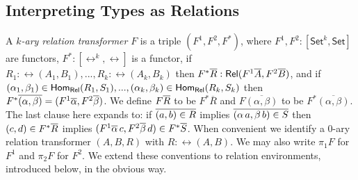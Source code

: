 \documentclass[runningheads]{llncs}
\newcommand{\set}{\mathsf{Set}}
\begin{document}
\begin{definition}
\begin{itemize}
\end{itemize}
\end{definition}

\subsection{Interpreting Types as Relations}\label{sec:rel-interp}

A {\em $k$-ary relation transformer} $F$ is a triple $(F^1, F^2,F^*)$,
where $F^1,F^2 : [\set^k,\set]$ are functors, $F^* : [\rel^k, \rel]$
is a functor, if $R_1:\rel(A_1,B_1),...,R_k:\rel(A_k,B_k)$ then $F^*
\overline{R} : \mathsf{Rel}(F^1 \overline{A}, F^2 \overline{B})$, and if $(\alpha_1, \beta_1)
\in \mathsf{Hom_{Rel}}(R_1,S_1),..., (\alpha_k, \beta_k) \in \mathsf{Hom_{Rel}}(R_k,S_k)$
then $F^* \overline{(\alpha, \beta)} = (F^1 \overline{\alpha}, F^2 \overline{\beta})$.
We define $F\overline{R}$ to be $F^*\overline{R}$ and
$F\overline{(\alpha,\beta)}$ to be $F^*\overline{(\alpha,\beta)}$.
The last clause here
expands to: if
$\overline{(a,b) \in R}$ implies $\overline{(\alpha\,a,\beta\,b) \in S}$ then
$(c,d) \in F^*\overline{R}$ implies $(F^1 \overline{\alpha}\,c,F^2 \overline{\beta}\,d)
\in F^*\overline{S}$. When convenient we identify a $0$-ary relation
transformer $(A,B,R)$ with $R : \rel(A,B)$. We may also write $\pi_1
F$ for $F^1$ and $\pi_2 F$ for $F^2$. We extend these conventions to
relation environments, introduced
below, in the obvious way.
\end{document}
